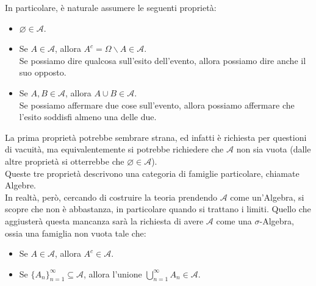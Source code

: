 \documentclass[11pt]{book}
\theoremstyle{Definizione}
\theoremstyle{TeoremaProposizioneLemmaCorollario}
\theoremstyle{OsservazioneNota}
\newcommand{\tolto}{\smallsetminus}
\begin{document}
In particolare, è naturale assumere le seguenti proprietà:
\begin{itemize}
\item $\varnothing \in \mathcal{A}$.
\item Se $A\in \mathcal{A}$, allora $A^c = \Omega \tolto A \in \mathcal{A}$.\\
Se possiamo dire qualcosa sull'esito dell'evento, allora possiamo dire anche il suo opposto.
\item Se $A,B\in \mathcal{A}$, allora $A\cup B\in \mathcal{A}$.\\
Se possiamo affermare due cose sull'evento, allora possiamo affermare che l'esito soddisfi almeno una delle due.
\end{itemize}
La prima proprietà potrebbe sembrare strana, ed infatti è richiesta per questioni di vacuità, ma equivalentemente si potrebbe richiedere che $\mathcal{A}$ non sia vuota (dalle altre proprietà si otterrebbe che $\varnothing\in \mathcal{A}$).\\
Queste tre proprietà descrivono una categoria di famiglie particolare, chiamate Algebre.\\
In realtà, però, cercando di costruire la teoria prendendo $\mathcal{A}$ come un'Algebra, si scopre che non è abbastanza, in particolare quando si trattano i limiti. Quello che aggiusterà questa mancanza sarà la richiesta di avere $\mathcal{A}$ come una $\sigma$-Algebra, ossia una famiglia non vuota tale che:
\begin{itemize}
\item Se $A\in \mathcal{A}$, allora $A^c\in \mathcal{A}$.
\item Se $\{A_n\}_{n = 1}^\infty \subseteq \mathcal{A}$, allora l'unione $\bigcup_{n = 1}^\infty A_n \in \mathcal{A}$.
\end{itemize}
\end{document}
